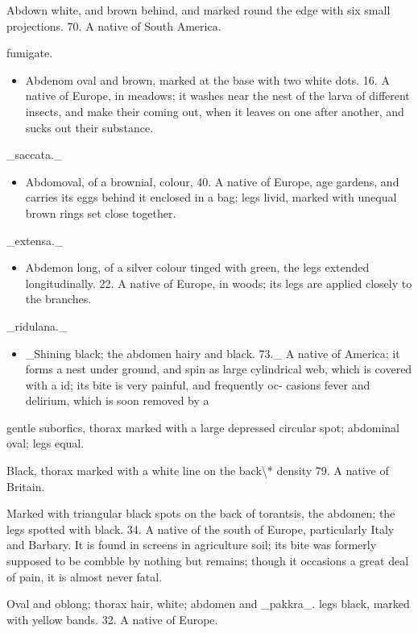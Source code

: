 \documentclass{article}
\begin{document}
Abdown white, and brown behind, and marked round the edge with six small projections. 70. A native of South America.

fumigate.

\begin{itemize}
\item Abdenom oval and brown, marked at the base with two white dots. 16. A native of Europe, in meadows; it washes near the nest of the larva of different insects, and make their coming out, when it leaves on one after another, and sucks out their substance.
\end{itemize}
\_saccata.\_

\begin{itemize}
\item Abdomoval, of a brownial, colour, 40. A native of Europe, age gardens, and carries its eggs behind it enclosed in a bag; legs livid, marked with unequal brown rings set close together.
\end{itemize}
\_extensa.\_

\begin{itemize}
\item Abdemon long, of a silver colour tinged with green, the legs extended longitudinally. 22. A native of Europe, in woods; its legs are applied closely to the branches.
\end{itemize}
\_ridulana.\_

\begin{itemize}
\item \_Shining black; the abdomen hairy and black. 73.\_ A native of America; it forms a nest under ground, and spin as large cylindrical web, which is covered with a id; its bite is very painful, and frequently oc- casions fever and delirium, which is soon removed by a
\end{itemize}
gentle suborfics, thorax marked with a large depressed circular spot; abdominal oval; legs equal.

Black, thorax marked with a white line on the back\textbackslash{}* density 79. A native of Britain.

Marked with triangular black spots on the back of torantsis, the abdomen; the legs spotted with black. 34. A native of the south of Europe, particularly Italy and Barbary. It is found in screens in agriculture soil; its bite was formerly supposed to be combble by nothing but remains; though it occasions a great deal of pain, it is almost never fatal.

Oval and oblong; thorax hair, white; abdomen and \_pakkra\_. legs black, marked with yellow bands. 32. A native of Europe.
\end{document}
